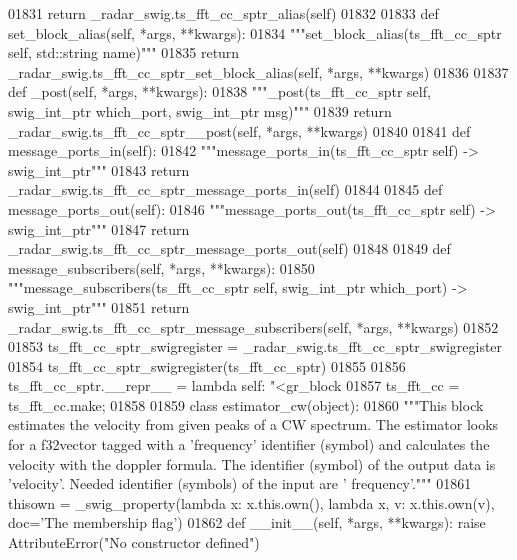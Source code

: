\begin{DoxyCode}
{{{{{{{01831         \textcolor{keywordflow}{return} \_radar\_swig.ts\_fft\_cc\_sptr\_alias(self)
01832 
01833     \textcolor{keyword}{def }set_block_alias(self, *args, **kwargs):
01834         \textcolor{stringliteral}{"""set\_block\_alias(ts\_fft\_cc\_sptr self, std::string name)"""}
01835         \textcolor{keywordflow}{return} \_radar\_swig.ts\_fft\_cc\_sptr\_set\_block\_alias(self, *args, **kwargs)
01836 
01837     \textcolor{keyword}{def }_post(self, *args, **kwargs):
01838         \textcolor{stringliteral}{"""\_post(ts\_fft\_cc\_sptr self, swig\_int\_ptr which\_port, swig\_int\_ptr msg)"""}
01839         \textcolor{keywordflow}{return} \_radar\_swig.ts\_fft\_cc\_sptr\_\_post(self, *args, **kwargs)
01840 
01841     \textcolor{keyword}{def }message_ports_in(self):
01842         \textcolor{stringliteral}{"""message\_ports\_in(ts\_fft\_cc\_sptr self) -> swig\_int\_ptr"""}
01843         \textcolor{keywordflow}{return} \_radar\_swig.ts\_fft\_cc\_sptr\_message\_ports\_in(self)
01844 
01845     \textcolor{keyword}{def }message_ports_out(self):
01846         \textcolor{stringliteral}{"""message\_ports\_out(ts\_fft\_cc\_sptr self) -> swig\_int\_ptr"""}
01847         \textcolor{keywordflow}{return} \_radar\_swig.ts\_fft\_cc\_sptr\_message\_ports\_out(self)
01848 
01849     \textcolor{keyword}{def }message_subscribers(self, *args, **kwargs):
01850         \textcolor{stringliteral}{"""message\_subscribers(ts\_fft\_cc\_sptr self, swig\_int\_ptr which\_port) -> swig\_int\_ptr"""}
01851         \textcolor{keywordflow}{return} \_radar\_swig.ts\_fft\_cc\_sptr\_message\_subscribers(self, *args, **kwargs)
01852 
01853 ts\_fft\_cc\_sptr\_swigregister = \_radar\_swig.ts\_fft\_cc\_sptr\_swigregister
01854 ts_fft_cc_sptr_swigregister(ts\_fft\_cc\_sptr)
01855 
01856 ts\_fft\_cc\_sptr.\_\_repr\_\_ = \textcolor{keyword}{lambda} self: \textcolor{stringliteral}{"<gr\_block %
01857 ts\_fft\_cc = ts\_fft\_cc.make;
01858 
01859 \textcolor{keyword}{class }estimator_cw(object):
01860     \textcolor{stringliteral}{"""This block estimates the velocity from given peaks of a CW spectrum. The estimator looks for a
       f32vector tagged with a 'frequency' identifier (symbol) and calculates the velocity with the doppler formula. The
       identifier (symbol) of the output data is 'velocity'. Needed identifier (symbols) of the input are '
      frequency'."""}
01861     thisown = _swig_property(\textcolor{keyword}{lambda} x: x.this.own(), \textcolor{keyword}{lambda} x, v: x.this.own(v), doc=\textcolor{stringliteral}{'The membership flag'})
01862     \textcolor{keyword}{def }__init__(self, *args, **kwargs): \textcolor{keywordflow}{raise} AttributeError(\textcolor{stringliteral}{"No constructor defined"})
}}}}}}}}
\end{DoxyCode}
